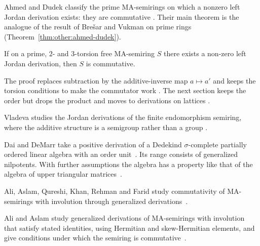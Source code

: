 Ahmed and Dudek classify the prime MA-semirings on which a nonzero left
Jordan derivation exists: they are commutative
\cite[pp.~624--631]{AhmedDudek2021}. Their main theorem is the analogue of the
result of Bre\v{s}ar and Vukman on prime rings
(Theorem~\ref{thm:other:ahmed-dudek}).

\begin{theorem}\label{thm:other:ahmed-dudek}
If on a prime, $2$- and $3$-torsion free MA-semiring $S$ there exists a
non-zero left Jordan derivation, then $S$ is commutative.
\end{theorem}

The proof replaces subtraction by the additive-inverse map $a \mapsto a'$
and keeps the torsion conditions to make the commutator work
\cite[pp.~631--632]{AhmedDudek2021}. The next section keeps the order but
drops the product and moves to derivations on lattices
\cite[Definition~3.1, p.~309]{XinLiLu2008}.

Vladeva studies the Jordan derivations of the finite endomorphism semiring,
where the additive structure is a semigroup rather than a group
\cite[Abstract, p.~1]{Vladeva2017Endomorphism}.

Dai and DeMarr take a positive derivation of a Dedekind
$\sigma$-complete partially ordered linear algebra with an order unit~\cite{WlPositiveDerivationsOnPartially1978}. Its
range
consists
of generalized nilpotents. With further assumptions the algebra has a
property like that of the algebra of upper triangular
matrices~\cite{WlPositiveDerivationsOnPartially1978}.

Ali, Aslam, Qureshi, Khan, Rehman and Farid study commutativity of
MA-semirings with involution through generalized
derivations~\cite{WlCommutativityOfMaSemiringsWith2020}.

Ali and Aslam study generalized derivations of MA-semirings with involution
that satisfy stated identities, using Hermitian and skew-Hermitian elements,
and give conditions under which the semiring is
commutative~\cite{WlOnCertainIdentitiesOfGeneraliz2026}.
